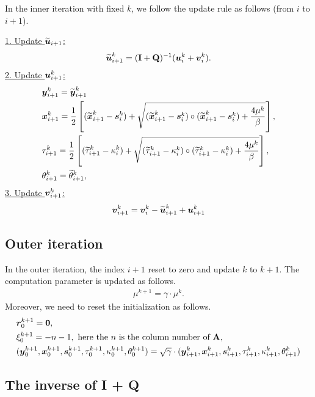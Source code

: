 In the inner iteration with fixed $k$, we follow the update rule as follows (from $i$ to $i+1$). 

\noindent\underline{1. Update $\widetilde{\boldsymbol{u}}_{i+1}$:} 
\begin{align*}
    \widetilde{\boldsymbol{u}}_{i+1}^k = ({\bf I} + {\bf Q})^{-1} (\boldsymbol{u}_i^k + \boldsymbol{v}_i^k). 
\end{align*}
\noindent\underline{2. Update $\boldsymbol{u}_{i+1}^k$:}
\begin{align*}
    &\boldsymbol{y}_{i+1}^k = \widetilde{\boldsymbol{y}}_{i+1}^k 
    \\ 
    &\boldsymbol{x}_{i+1}^k = 
    \frac{1}{2}\left[
        (\widetilde{\boldsymbol{x}}_{i+1}^k - \boldsymbol{s}_i^k) + 
        \sqrt{(\widetilde{\boldsymbol{x}}_{i+1}^k - \boldsymbol{s}_i^k)\circ(\widetilde{\boldsymbol{x}}_{i+1}^k - \boldsymbol{s}_i^k) + \frac{4\mu^k}{\beta}}
    \right], 
    \\ 
    &\tau_{i+1}^k = 
    \frac{1}{2}\left[
        (\widetilde{\tau}_{i+1}^k - \kappa_i^k) 
        + \sqrt{(\widetilde{\tau}_{i+1}^k - \kappa_i^k)\circ(\widetilde{\tau}_{i+1}^k - \kappa_i^k) + \frac{4\mu^k}{\beta}}
    \right], 
    \\ 
    &\theta_{i+1}^k = \widetilde{\theta}_{i+1}^k,
\end{align*}
\noindent\underline{3. Update $\boldsymbol{v}_{i+1}^k$:}
\begin{align*}
\boldsymbol{v}_{i+1}^k = \boldsymbol{v}_i^k - \widetilde{\boldsymbol{u}}_{i+1}^k + \boldsymbol{u}_{i+1}^k 
\end{align*}

\subsection{Outer iteration}

In the outer iteration, the index $i+1$ reset to zero and update $k$ to $k+1$. The computation parameter is updated as follows. 
\begin{align*}
    \mu^{k+1} = \gamma \cdot \mu^k.
\end{align*}
Moreover, we need to reset the initialization as follows. 
\begin{align*}
    &\boldsymbol{r}_0^{k+1} = \boldsymbol{0}, 
    \\
    &\xi_0^{k+1} = -n - 1, ~\text{here the $n$ is the column number of ${\bf A}$}, 
    \\ 
    &(\boldsymbol{y}_0^{k+1},\boldsymbol{x}_0^{k+1}, \boldsymbol{s}_0^{k+1}, \tau_0^{k+1}, \kappa_0^{k+1}, \theta_0^{k+1}) 
    = \sqrt{\gamma}\cdot 
    (\boldsymbol{y}_{i+1}^k,\boldsymbol{x}_{i+1}^k, \boldsymbol{s}_{i+1}^k, \tau_{i+1}^k, \kappa_{i+1}^k, \theta_{i+1}^k)
\end{align*}

\subsection{The inverse of I + Q}